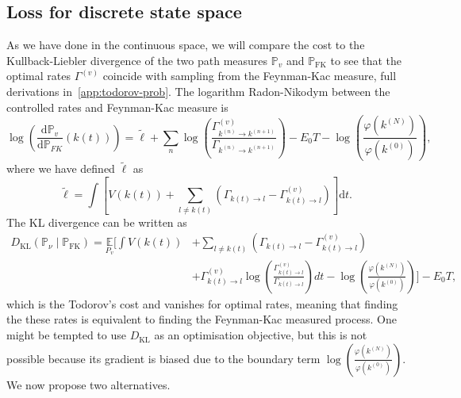 \subsection{Loss for discrete state space}
\label{subsec:discrete_loss}
As we have done in the continuous space, we will compare the cost to the Kullback-Liebler divergence of the two path measures $\mathbb{P}_v$ and $\mathbb{P}_{\mathrm{FK}}$ to see that the optimal rates $\Gamma^{(v)}$ coincide with sampling from the Feynman-Kac measure, full derivations in~\ref{app:todorov-prob}. The logarithm Radon-Nikodym between the controlled rates and Feynman-Kac measure is
\begin{equation}
	\label{eq:logrn-discrete}
	\log \left(\frac{\mathrm{d} \mathbb{P}_{v}}{\mathrm{d} \mathbb{P}_{F K}}(k(t))\right)
	= \tilde \ell
	+\sum_{n} \log \left(\frac{\Gamma_{k^{(n)} \rightarrow k^{(n+1)}}^{(v)}}{\Gamma_{k^{(n)} \rightarrow k^{(n+1)}}}\right)-E_{0} T-\log \left(\frac{\varphi(k^{(N)})}{\varphi(k^{(0)})}\right),
\end{equation}
where we have defined $\tilde \ell$ as
\begin{equation}
\tilde \ell = \int \left[V(k(t))+\sum_{l \neq k(t)}\left(\Gamma_{k(t) \rightarrow l}-\Gamma_{k(t) \rightarrow l}^{(v)}\right)\right] \mathrm{d}t.
\end{equation}
The KL divergence can be written as
\begin{equation}
	\begin{aligned}
		D_{\mathrm{KL}}\left(\mathbb{P}_{\nu} \mid \mathbb{P}_{\mathrm{FK}}\right) = \underset{P_{v}}{\mathbb{E}}\Bigg[\int V(k(t))&+\sum_{l \neq k(t)}\left(\Gamma_{k(t) \rightarrow l}-\Gamma_{k(t) \rightarrow l}^{(v)}\right)\\
		&+\Gamma_{k(t) \rightarrow l}^{(v)} \log \left(\frac{\Gamma_{k(t) \rightarrow l}^{(v)}}{\Gamma_{k(t) \rightarrow l}}\right) d t-\log \left(\frac{\varphi(k^{(N)})}{\varphi(k^{(0)})}\right)\Bigg]-E_{0} T,
	\end{aligned}
\end{equation}
which is the Todorov's cost and vanishes for optimal rates, meaning that finding the these rates is equivalent to finding the Feynman-Kac measured process. One might be tempted to use $D_{\mathrm{KL}}$ as an optimisation objective, but this is not possible because its gradient is biased due to the boundary term
$\log \left(\frac{\varphi(k^{(N)})}{\varphi(k^{(0)})}\right)$. We now propose two alternatives.

